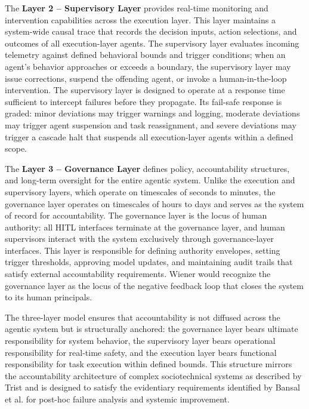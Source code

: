 The \textbf{Layer 2 -- Supervisory Layer} provides real-time monitoring and intervention capabilities across the execution layer. This layer maintains a system-wide causal trace that records the decision inputs, action selections, and outcomes of all execution-layer agents. The supervisory layer evaluates incoming telemetry against defined behavioral bounds and trigger conditions; when an agent's behavior approaches or exceeds a boundary, the supervisory layer may issue corrections, suspend the offending agent, or invoke a human-in-the-loop intervention. The supervisory layer is designed to operate at a response time sufficient to intercept failures before they propagate. Its fail-safe response is graded: minor deviations may trigger warnings and logging, moderate deviations may trigger agent suspension and task reassignment, and severe deviations may trigger a cascade halt that suspends all execution-layer agents within a defined scope.

The \textbf{Layer 3 -- Governance Layer} defines policy, accountability structures, and long-term oversight for the entire agentic system. Unlike the execution and supervisory layers, which operate on timescales of seconds to minutes, the governance layer operates on timescales of hours to days and serves as the system of record for accountability. The governance layer is the locus of human authority: all HITL interfaces terminate at the governance layer, and human supervisors interact with the system exclusively through governance-layer interfaces. This layer is responsible for defining authority envelopes, setting trigger thresholds, approving model updates, and maintaining audit trails that satisfy external accountability requirements. Wiener \cite{wiener1948} would recognize the governance layer as the locus of the negative feedback loop that closes the system to its human principals.

The three-layer model ensures that accountability is not diffused across the agentic system but is structurally anchored: the governance layer bears ultimate responsibility for system behavior, the supervisory layer bears operational responsibility for real-time safety, and the execution layer bears functional responsibility for task execution within defined bounds. This structure mirrors the accountability architecture of complex sociotechnical systems as described by Trist \cite{tristr81} and is designed to satisfy the evidentiary requirements identified by Bansal et al. \cite{bansal2019} for post-hoc failure analysis and systemic improvement.